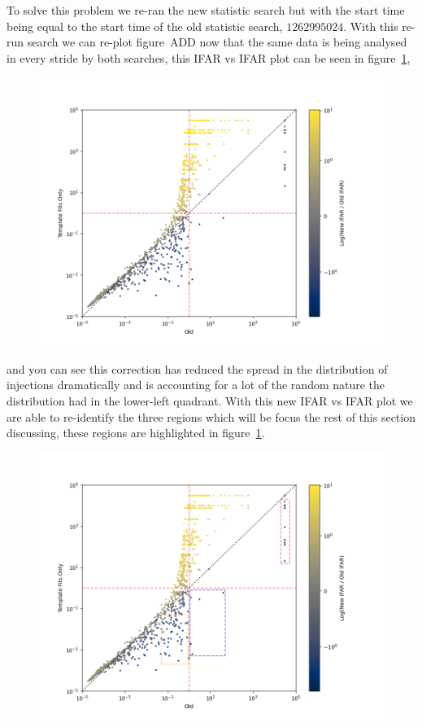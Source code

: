 To solve this problem we re-ran the new statistic search but with the start time being equal to the start time of the old statistic search, $1262995024$. With this re-run search we can re-plot figure~ADD now that the same data is being analysed in every stride by both searches, this IFAR vs IFAR plot can be seen in figure~\ref{5:fig:ifar-ifar-fits-only-0s},
%
\begin{figure}
       \centering
    \includegraphics[width=1.2\textwidth]{images/5_pycbclive/fits_only_0s_ifar_vs_ifar_log_ifar_diff.png}
    \caption{}
    \label{5:fig:ifar-ifar-fits-only-0s}
\end{figure}
%
and you can see this correction has reduced the spread in the distribution of injections dramatically and is accounting for a lot of the random nature the distribution had in the lower-left quadrant. With this new IFAR vs IFAR plot we are able to re-identify the three regions which will be focus the rest of this section discussing, these regions are highlighted in figure~\ref{5:fig:ifar-ifar-fits-only-0s}.
%
\begin{figure}
    \centering  
    \includegraphics[width=1.2\textwidth]{images/5_pycbclive/fits_only_0s_ifar_vs_ifar_regions.png}
    \caption{}
    \label{5:fig:ifar-ifar-fits-only-0s-regions}
\end{figure}
